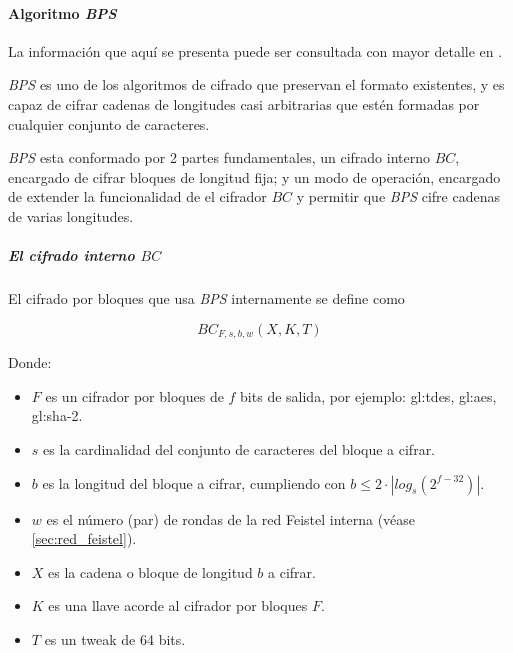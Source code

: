 %
%

\paragraph{Algoritmo \textit{BPS}}

La información que aquí se presenta puede ser consultada con mayor detalle en
\cite{bps}.

\textit{BPS} es uno de los algoritmos de cifrado que preservan el formato 
existentes, y es capaz de cifrar cadenas de longitudes casi arbitrarias que 
estén formadas por cualquier conjunto de caracteres.

\textit{BPS} esta conformado por 2 partes fundamentales, un cifrado interno 
$BC$, encargado de cifrar bloques de longitud fija; y un modo de operación, 
encargado de extender la funcionalidad de el cifrador $BC$ y permitir que 
\textit{BPS} cifre cadenas de varias longitudes.


\subparagraph{El cifrado interno $BC$}


El cifrado por bloques que usa \textit{BPS} internamente se define como 

\begin{equation}
  BC_{F,s,b,w}(X,K,T)
\end{equation}

Donde:
\begin{itemize}
  \item $F$ es un cifrador por bloques de $f$ bits de salida,
    por ejemplo: \gls{gl:tdes}, \gls{gl:aes}, \gls{gl:sha}-2.
  \item $s$ es la cardinalidad del conjunto de caracteres del bloque a cifrar.
  \item $b$ es la longitud del bloque a cifrar, 
    cumpliendo con $b \leq 2 \cdot |log_s(2^{f-32})|$.
  \item $w$ es el número (par) de rondas de la red Feistel interna 
    (véase \ref{sec:red_feistel}).
  \item $X$ es la cadena o bloque de longitud $b$ a cifrar.
  \item $K$ es una llave acorde al cifrador por bloques $F$.
  \item $T$ es un tweak de 64 bits.
\end{itemize}

